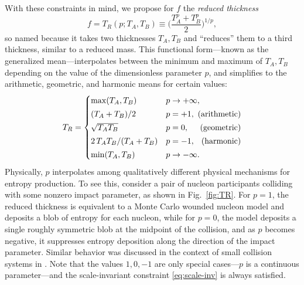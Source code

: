 \documentclass[aps,prc,reprint,amsmath]{revtex4-1}
\begin{document}
With these constraints in mind, we propose for $f$ the \emph{reduced thickness}
\begin{equation}
  f = T_R(p; T_A, T_B) \equiv \biggl( \frac{T_A^p + T_B^p}{2} \biggr)^{1/p},
  \label{eq:tr}
\end{equation}
so named because it takes two thicknesses $T_A, T_B$ and ``reduces'' them to a third thickness, similar to a
reduced mass.
This functional form---known as the generalized mean---interpolates between the minimum and maximum of $T_A, T_B$ depending on the value of the dimensionless parameter $p$, and simplifies to the arithmetic, geometric, and harmonic means for certain values:
\begin{equation}
  \newlength{\extraspace}
  \setlength{\extraspace}{0.5ex}
  T_R =
  \begin{cases}
    \max(T_A, T_B) & p \rightarrow +\infty, \\[\extraspace]
    (T_A + T_B)/2 & p = +1, \hfill \text{ (arithmetic)} \\[\extraspace]
    \sqrt{T_A T_B} & p = 0, \hfill \text{ (geometric)} \\[\extraspace]
    2\, T_A T_B/(T_A + T_B) & p = -1, \hfill \text{ (harmonic)} \\[\extraspace]
    \min(T_A, T_B) & p \rightarrow -\infty.
  \end{cases}
\end{equation}
Physically, $p$ interpolates among qualitatively different physical mechanisms for entropy production.
To see this, consider a pair of nucleon participants colliding with some nonzero impact parameter, as shown in Fig.~\ref{fig:TR}.
For $p = 1$, the reduced thickness is equivalent to a Monte Carlo wounded nucleon model and deposits a blob of entropy for each nucleon,
while for $p = 0$, the model deposits a single roughly symmetric blob at the midpoint of the collision,
and as $p$ becomes negative, it suppresses entropy deposition along the direction of the impact parameter.
Similar behavior was discussed in the context of small collision systems in \cite{Bzdak:2013zma}.
Note that the values $1, 0, -1$ are only special cases---$p$ is a continuous parameter---and the scale-invariant constraint \eqref{eq:scale-inv} is always satisfied.
\end{document}

